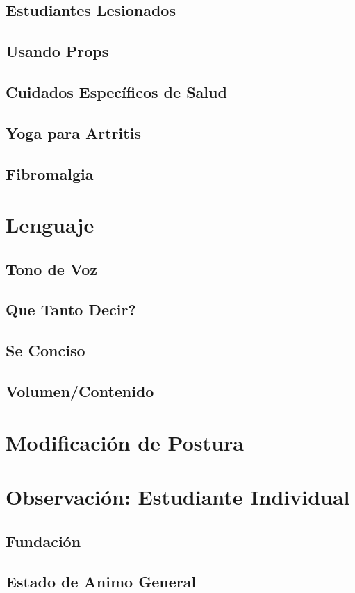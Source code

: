 \subsection{Estudiantes Lesionados}
\subsection{Usando Props}
\subsection{Cuidados Específicos de Salud}
\subsection{Yoga para Artritis}
\subsection{Fibromalgia}
\section{Lenguaje}
\subsection{Tono de Voz}
\subsection{Que Tanto Decir?}
\subsection{Se Conciso}
\subsection{Volumen/Contenido}
\section{Modificación de Postura}
\section{Observación: Estudiante Individual}
\subsection{Fundación}
\subsection{Estado de Animo General}
